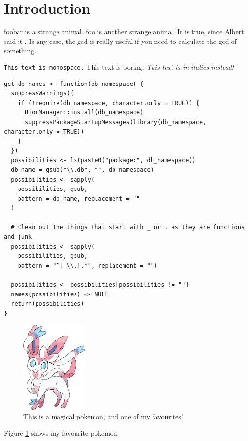 \section{Introduction}

\gls{foobar} is a strange animal. \gls{foo} is another strange animal. It is true, since Albert said it \cite{AlbertRelativity}. Is any case, the \gls{gcd} is really useful if you need to calculate the \gls{gcd} of something.

\texttt{This text is monospace.} This text is boring. \textit{This text is in italics instead!}

\begin{lstlisting}[caption=This is a listing]
get_db_names <- function(db_namespace) {
  suppressWarnings({
    if (!require(db_namespace, character.only = TRUE)) {
      BiocManager::install(db_namespace)
      suppressPackageStartupMessages(library(db_namespace, character.only = TRUE))
    }
  })
  possibilities <- ls(paste0("package:", db_namespace))
  db_name = gsub("\\.db", "", db_namespace)
  possibilities <- sapply(
    possibilities, gsub,
    pattern = db_name, replacement = ""
  )
  
  # Clean out the things that start with _ or . as they are functions and junk
  possibilities <- sapply(
    possibilities, gsub,
    pattern = "^[_\\.].*", replacement = "")
  
  possibilities <- possibilities[possibilities != ""]
  names(possibilities) <- NULL
  return(possibilities)
}
\end{lstlisting}

\begin{figure}[H]
    \centering
    \includegraphics[width=0.3\textwidth]{resources/images/sylveon.jpg}
    \caption{This is a magical pokemon, and one of my favourites!}
    \label{fig:pokemon}
\end{figure}

Figure \ref{fig:pokemon} shows my favourite pokemon.